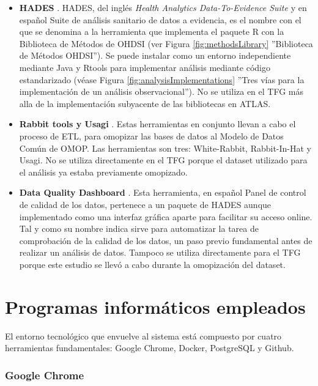 \begin{itemize}
    
    \item \textbf{HADES} \cite{githubHADES}. HADES, del inglés\textit{ Health Analytics Data-To-Evidence Suite} y en español Suite de análisis sanitario de datos a evidencia, es el nombre con el que se denomina a la herramienta que implementa el paquete R con la Biblioteca de Métodos de OHDSI (ver Figura \ref{fig:methodsLibrary} ''Biblioteca de Métodos OHDSI''). Se puede instalar como un entorno independiente mediante Java y Rtools para implementar análisis mediante código estandarizado (véase Figura \ref{fig:analysisImplementations} ''Tres vías para la implementación de un análisis observacional''). No se utiliza en el TFG más alla de la implementación subyacente de las bibliotecas en ATLAS.
    \item \textbf{Rabbit tools y Usagi} \cite{OHDSIsoftTools}. Estas herramientas en conjunto llevan a cabo el proceso de ETL, para omopizar las bases de datos al Modelo de Datos Común de OMOP. Las herramientas son tres: White-Rabbit, Rabbit-In-Hat y Usagi. No se utiliza directamente en el TFG porque el dataset utilizado para el análisis ya estaba previamente omopizado.
    \item \textbf{Data Quality Dashboard} \cite{githubDQD}. Esta herramienta, en español Panel de control de calidad de los datos, pertenece a un paquete de HADES aunque implementado como una interfaz gráfica aparte para facilitar su acceso online. Tal y como su nombre indica sirve para automatizar la tarea de comprobación de la calidad de los datos, un paso previo fundamental antes de realizar un análisis de datos. Tampoco se utiliza directamente para el TFG porque este estudio se llevó a cabo durante la omopización del dataset.
        
\end{itemize}

\section{Programas informáticos empleados} \label{sec:07entorno}

El entorno tecnológico que envuelve al sistema está compuesto por cuatro herramientas fundamentales:  Google Chrome, Docker, PostgreSQL y Github.


\subsubsection{Google Chrome}

